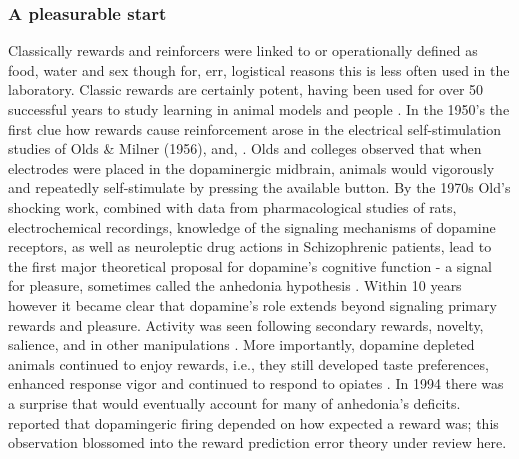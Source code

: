 \subsubsection{A pleasurable start} %
\label{subsub:start}
Classically rewards and reinforcers were linked to or operationally defined as food, water \cite{ODoherty:2006p2875,schultz:2007aa} and sex though for, err, logistical reasons this is less often used in the laboratory.  Classic rewards are certainly potent, having been used for over 50 successful years to study learning in animal models \cite{iversen:2007aa} and people \cite{Kim:2010p7248,Montague:2006mz}.  In the 1950's the first clue how rewards cause reinforcement arose in the electrical self-stimulation studies of Olds \& Milner (1956), and, .  Olds and colleges observed that when electrodes were placed in the dopaminergic midbrain, animals would vigorously and repeatedly self-stimulate by pressing the available button.  By the 1970s Old's shocking work, combined with data from pharmacological studies of rats, electrochemical recordings, knowledge of the signaling mechanisms of dopamine receptors, as well as neuroleptic drug actions in Schizophrenic patients, lead to the first major theoretical proposal for dopamine's cognitive function - a signal for pleasure, sometimes called the anhedonia hypothesis \cite{Wise:1978p8771}.  Within 10 years however it became clear that dopamine's role extends beyond signaling primary rewards and pleasure. Activity was seen following secondary rewards, novelty, salience, and in other manipulations \cite{Spanagel:1999p8515, Salamone:2005p8774, BrombergMartin:2010p8834}.  More importantly, dopamine depleted animals continued to enjoy rewards, i.e., they still developed taste preferences, enhanced response vigor \cite{Cannon:2003p8513} and continued to respond to opiates \cite{Hnasko:2005p8832}.  In 1994 there was a surprise that would eventually account for many of anhedonia's deficits.   reported that dopamingeric firing depended on how expected a reward was; this observation blossomed into the reward prediction error theory under review here.

